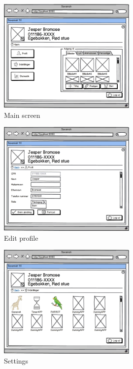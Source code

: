 \begin{figure}[H]
	\centering
		\includegraphics[width=0.60\textwidth]{images/Mocks/2-Main.png}
	\caption{Main screen}
	\label{fig:2-Main}
\end{figure}

\begin{figure}[H]
	\centering
		\includegraphics[width=0.60\textwidth]{images/Mocks/22-Profile.png}
	\caption{Edit profile}
	\label{fig:22-Profile}
\end{figure}

\begin{figure}[H]
	\centering
		\includegraphics[width=0.60\textwidth]{images/Mocks/23-Settings.png}
	\caption{Settings}
	\label{fig:23-Settings}
\end{figure}

